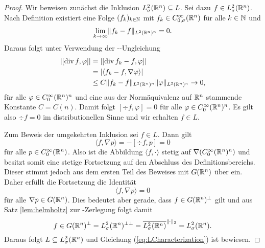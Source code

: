\begin{proof}
  Wir beweisen zunächst die Inklusion $L_\sigma^2(\mathbb{R}^n) \subseteq L$.
  Sei dazu $f \in L_\sigma^2(\mathbb{R}^n)$.
  Nach Definition existiert eine Folge $(f_k)_{k \in \mathbb{N}}$ mit $f_k \in C_{0,\sigma}^\infty(\mathbb{R}^n)$ für alle $k \in \mathbb{N}$ und 
  $$
  \lim_{k \to \infty} \lVert f_k - f \rVert_{L^2(\mathbb{R}^n)^n} = 0.
  $$
  Daraus folgt unter Verwendung der \cauchy\hyp{}\schwartz\hyp{}Ungleichung
  \begin{align*}
    |[\mathrm{div\,} f, \varphi] |
    &= |[\mathrm{div\,} f_k - f, \varphi] | \\
    &= |\langle f_k - f, \nabla \varphi \rangle| \\
    & \leq C\lVert f_k - f \rVert_{L^2(\mathbb{R}^n)^n} \lVert \varphi \rVert_{L^2(\mathbb{R}^n)^n} 
    \to 0,
  \end{align*}
  für alle $\varphi \in C_0^\infty(\mathbb{R}^n)^n$ und eine aus der Normäquivalenz auf $\mathbb{R}^n$ stammende Konstante $C = C(n)$.
  Damit folgt $[\div f, \varphi] = 0$ für alle $\varphi \in C_0^\infty(\mathbb{R}^n)^n$.
  Es gilt also $\div f = 0$ im distributionellen Sinne und wir erhalten $f \in L$.

  Zum Beweis der umgekehrten Inklusion sei $f \in L$.
  Dann gilt
  $$
  \langle f, \nabla p \rangle = -[\div f, p] = 0
  $$
  für alle $p \in C_0^\infty(\mathbb{R}^n)$.
  Also ist die Abbildung $\langle f, \cdot\rangle$ stetig auf $\nabla (C_0^\infty(\mathbb{R}^n)^n)$ und besitzt somit eine stetige Fortsetzung auf den Abschluss des Definitionsbereichs. 
  Dieser stimmt jedoch aus dem ersten Teil des Beweises mit $G(\mathbb{R}^n)$ über ein.
  Daher erfüllt die Fortsetzung die Identität
  $$
  \langle f, \nabla p \rangle = 0 
  $$
  für alle $\nabla p \in G(\mathbb{R}^n)$.
  Dies bedeutet aber gerade, dass $f \in G(\mathbb{R}^n)^\perp$ gilt und aus Satz \ref{lem:helmholtz} zur \helmholtz\hyp{}Zerlegung folgt damit
  $$
  f \in G(\mathbb{R}^n)^\perp 
  = L_\sigma^2(\mathbb{R}^n)^{\perp\perp} 
  = \overline{L_\sigma^2(\mathbb{R}^n)}^{\lVert \cdot \rVert_2}
  = L_\sigma^2(\mathbb{R}^n).
  $$
  Daraus folgt $L \subseteq L_\sigma^2(\mathbb{R}^n)$ und Gleichung (\ref{eq:LCharacterization}) ist bewiesen.
\end{proof}

